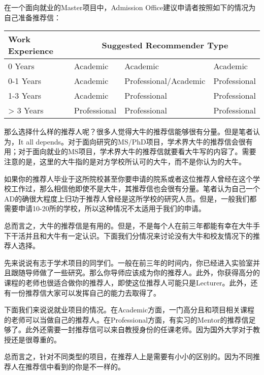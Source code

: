 在一个面向就业的Master项目中，Admission Office建议申请者按照如下的情况为自己准备推荐信：

\begin{center}
\begin{tabular}{|l|l|l|l|}
\hline
Work Experience	 & \multicolumn{3}{|c|}{Suggested Recommender Type} \\
\hline
0 Years	& Academic	& Academic	& Academic\\ 
0-1 Years & Academic & Professional/Academic & Professional\\ 
1-3 Years & Academic & Professional & Professional\\ 
> 3 Years & Professional & Professional & Professional\\
\hline
\end{tabular}
\end{center}

那么选择什么样的推荐人呢？很多人觉得大牛的推荐信能够很有分量。但是笔者认为，It all depends。对于面向研究的MS/PhD项目，学术界大牛的推荐信会很有用；对于面向就业的MS项目，学术界大牛的推荐信就要看大牛写的内容了。需要注意的是，这里的大牛指的是对方学校所认可的大牛，而不是你认为的大牛。\par
如果你的推荐人毕业于这所院校甚至你要申请的院系或者这位推荐人曾经在这个学校工作过，那么相信他即使不是大牛，其推荐信也会很有分量。笔者认为自己一个AD的确很大程度上归功于推荐人曾经是这所学校的研究人员。但是，一般我们都需要申请10-20所的学校，所以这种情况不太适用于我们的申请。\par
总而言之，大牛的推荐信是有用的。但是，不是每个人在前三年都能有幸在大牛手下干活并且和大牛有一定认识。下面我们分情况来讨论没有大牛和校友情况下的推荐人选择。\par
先来说说有志于学术项目的同学们。一般在前三年的时间内，你已经进入实验室并且跟随导师做了一些研究。那么你导师应该成为你的推荐人。此外，你获得高分的课程的老师也很适合做你的推荐人，即使这位推荐人可能只是Lecturer。此外，还有一份推荐信大家可以发挥自己的能力去取得了。\par
下面我们来说说就业项目的情况。在Academic方面，一门高分且和项目相关课程的老师可以当做自己的推荐人。在Professional方面，有实习的Mentor的推荐信足够了。此外还需要一封推荐信可以来自教授身份的任课老师。因为国外大学对于教授还是很尊重的。\par
总而言之，针对不同类型的项目，在推荐人上是需要有小小的区别的。因为不同推荐人在推荐信中看到的你是不一样的。

